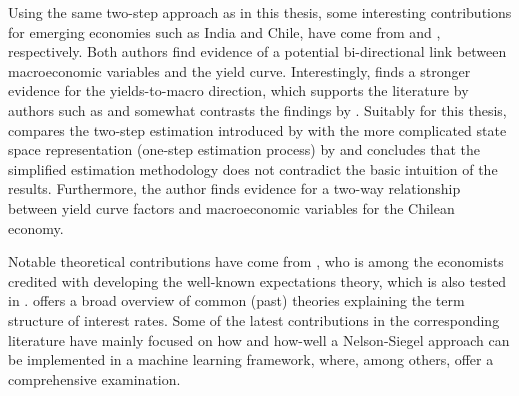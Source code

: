 Using the same two-step approach as in this thesis, some interesting contributions for emerging economies such as India and Chile, have come from \citet{kanjilal2011macroeconomic} and \citet{morales2010real}, respectively. 
Both authors find evidence of a potential bi-directional link between macroeconomic variables and the yield curve. 
Interestingly, \citet{kanjilal2011macroeconomic} finds a stronger evidence for the yields-to-macro direction, which supports the literature by authors such as \citet{estrella1991term} and somewhat contrasts the findings by \citet{diebold2006macroeconomy}. 
Suitably for this thesis, \citet{morales2010real} compares the two-step estimation introduced by \citet{diebold2006forecasting} with the more complicated state space representation (one-step estimation process) by \citet{diebold2006macroeconomy} and concludes that the simplified estimation methodology does not contradict the basic intuition of the results. Furthermore, the author finds evidence for a two-way relationship between yield curve factors and macroeconomic variables for the Chilean economy. 


Notable theoretical contributions have come from \citet{hicks1946value}, who is among the economists credited with developing the well-known expectations theory, which is also tested in \citet{diebold2006macroeconomy}. 
\citet{kessel1971cyclical} offers a broad overview of common (past) theories explaining the term structure of interest rates.
Some of the latest contributions in the corresponding literature have mainly focused on how and how-well a Nelson-Siegel approach can be implemented in a machine learning framework, where, among others, \citet{pedersen2019survey} offer a comprehensive examination. 